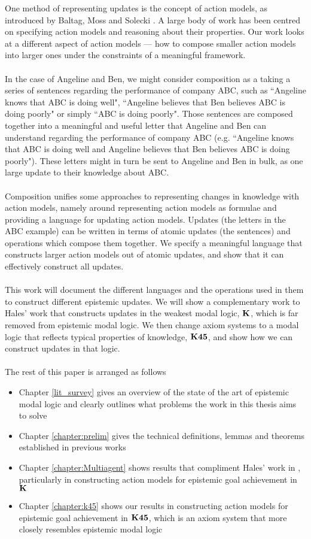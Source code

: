 One method of representing updates is the concept of action models, as
introduced by Baltag, Moss and Solecki \cite{baltag1998lpa}.
A large body of work has been centred on specifying action models and reasoning
about their properties.
Our work looks at a different aspect of action models --- how to compose smaller action models
into larger ones under the constraints of a meaningful framework.\\
\\
In the case of Angeline and Ben, we might consider composition as a taking a series of sentences
regarding the performance of company ABC, such as ``Angeline knows that ABC is doing well", ``Angeline
believes that Ben believes ABC is doing poorly" or simply ``ABC is doing poorly".
Those sentences are composed together into a meaningful and useful letter that Angeline and Ben can
understand regarding the performance of company ABC (e.g. ``Angeline knows that ABC is doing well
and Angeline believes that Ben believes ABC is doing poorly").
These letters might in turn be sent to Angeline and Ben in bulk, as one large update to their knowledge
about ABC.\\
\\
Composition unifies some approaches to representing changes in knowledge with action models, namely
around representing action models as formulae and providing a language for updating action models.
Updates (the letters in the ABC example) can be written in terms of atomic updates (the sentences)
and operations which compose them together.
We specify a meaningful language that constructs larger action models out of atomic updates, and
show that it can effectively construct all updates.\\
\\
This work will document the different languages and the operations used in them to construct
different epistemic updates.
We will show a complementary work to Hales' \cite{hales13synthesis} work that constructs updates in the weakest modal logic,
$\bf K$, which is far removed from epistemic modal logic.
We then change axiom systems to a modal logic that reflects typical properties of knowledge,
$\bf K45$, and show how we can construct updates in that logic.\\
\\
The rest of this paper is arranged as follows
\begin{itemize}
	\item Chapter \ref{lit_survey} gives an overview of the state of the art of epistemic modal logic
		and clearly outlines what problems the work in this thesis aims to solve
	\item Chapter \ref{chapter:prelim} gives the technical definitions, lemmas and theorems
		established in previous works
	\item Chapter \ref{chapter:Multiagent} shows results that compliment Hales' work in
		\cite{hales13synthesis}, particularly in constructing action models for epistemic goal
		achievement in $\bf K$
	\item Chapter \ref{chapter:k45} shows our results in constructing action models for epistemic goal
		achievement in $\bf K45$, which is an axiom system that more closely resembles epistemic modal
		logic
\end{itemize}
